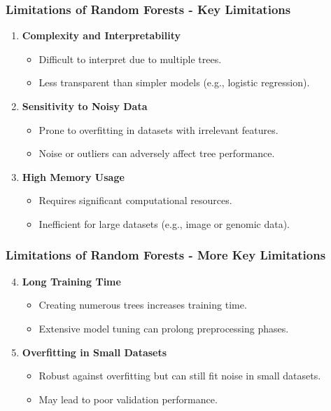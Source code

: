 \documentclass[aspectratio=169]{beamer}
\begin{document}
\begin{frame}[fragile]
    \frametitle{Limitations of Random Forests - Key Limitations}
    \begin{enumerate}
        \item \textbf{Complexity and Interpretability}
        \begin{itemize}
            \item Difficult to interpret due to multiple trees.
            \item Less transparent than simpler models (e.g., logistic regression).
        \end{itemize}

        \item \textbf{Sensitivity to Noisy Data}
        \begin{itemize}
            \item Prone to overfitting in datasets with irrelevant features.
            \item Noise or outliers can adversely affect tree performance.
        \end{itemize}

        \item \textbf{High Memory Usage}
        \begin{itemize}
            \item Requires significant computational resources.
            \item Inefficient for large datasets (e.g., image or genomic data).
        \end{itemize}
    \end{enumerate}
\end{frame}

\begin{frame}[fragile]
    \frametitle{Limitations of Random Forests - More Key Limitations}
    \begin{enumerate}
        \setcounter{enumi}{3}
        \item \textbf{Long Training Time}
        \begin{itemize}
            \item Creating numerous trees increases training time.
            \item Extensive model tuning can prolong preprocessing phases.
        \end{itemize}

        \item \textbf{Overfitting in Small Datasets}
        \begin{itemize}
            \item Robust against overfitting but can still fit noise in small datasets.
            \item May lead to poor validation performance.
        \end{itemize}
    \end{enumerate}
\end{frame}
\end{document}
